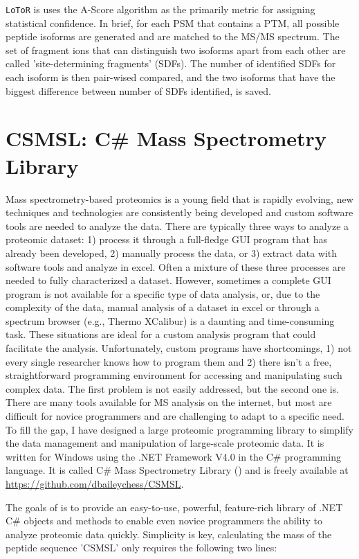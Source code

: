 \texttt{LoToR} is uses the A-Score algorithm as the primarily metric for assigning statistical confidence.\cite{ascore} In brief, for each PSM that contains a PTM, all possible peptide isoforms are generated and are matched to the MS/MS spectrum. The set of fragment ions that can distinguish two isoforms apart from each other are called 'site-determining fragments' (SDFs). The number of identified SDFs for each isoform is then pair-wised compared, and the two isoforms that have the biggest difference between number of SDFs identified, is saved.

\section{CSMSL: C\# Mass Spectrometry Library}
Mass spectrometry-based proteomics is a young field that is rapidly evolving, new techniques and technologies are consistently being developed and custom software tools are needed to analyze the data. There are typically three ways to analyze a proteomic dataset: 1) process it through a full-fledge GUI program that has already been developed, 2) manually process the data, or 3) extract data with software tools and analyze in excel. Often a mixture of these three processes are needed to fully characterized a dataset. However, sometimes a complete GUI program is not available for a specific type of data analysis, or, due to the complexity of the data, manual analysis of a dataset in excel or through a spectrum browser (e.g., Thermo XCalibur) is a daunting and time-consuming task. These situations are ideal for a custom analysis program that could facilitate the analysis. Unfortunately, custom programs have shortcomings, 1) not every single researcher knows how to program them and 2) there isn't a free, straightforward programming environment for accessing and manipulating such complex data. The first problem is not easily addressed, but the second one is. There are many tools available for MS analysis on the internet, but most are difficult for novice programmers and are challenging to adapt to a specific need. To fill the gap, I have designed a large proteomic programming library to simplify the data management and manipulation of large-scale proteomic data. It is written for Windows using the .NET Framework V4.0 in the C\# programming language. It is called C\# Mass Spectrometry Library (\csmsl{}) and is freely available at \url{https://github.com/dbaileychess/CSMSL}.

The goals of \csmsl{} is to provide an easy-to-use, powerful, feature-rich library of .NET C\# objects and methods to enable even novice programmers the ability to analyze proteomic data quickly. Simplicity is key, calculating the mass of the peptide sequence 'CSMSL' only requires the following two lines:

